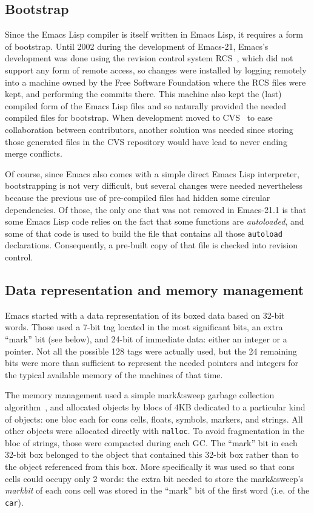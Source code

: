 \documentclass[format=acmsmall, review]{acmart}
\newcommand \Elisp {Emacs Lisp}
\begin{document}
\subsection{Bootstrap}
\label{sec:bootstrap}

Since the \Elisp{} compiler is itself written in \Elisp{}, it requires
a form of bootstrap.  Until 2002 during the development of Emacs-21, Emacs's
development was done using the revision control system RCS~\cite{Tichy85},
which did not support any form of remote access, so
changes were installed by logging remotely into a machine owned by the
Free Software Foundation where the RCS files were kept, and
performing the commits there.  This machine also kept the (last) compiled
form of the \Elisp{} files and so naturally provided the needed compiled
files for bootstrap.  When development moved to CVS~\cite{Berliner90} to ease
collaboration between contributors, another solution was needed since
storing those generated files in the CVS repository
would have lead to never ending merge conflicts.

Of course, since Emacs also comes with a simple direct \Elisp{} interpreter,
bootstrapping is not very difficult, but several changes were needed
nevertheless because the previous use of pre-compiled files had hidden some
circular dependencies.  Of those, the only one that was not removed in
Emacs-21.1 is that some \Elisp{} code relies on the fact that some
functions are \emph{autoloaded}, and some of that code is used to build the
file that contains all those \texttt{autoload} declarations.  Consequently,
a pre-built copy of that file is checked into revision control.

\subsection{Data representation and memory management}
\label{sec:data-representation}

Emacs started with a data representation of its boxed data based on 32-bit
words.  Those used a 7-bit tag located in the most significant bits, an extra
``mark'' bit (see below), and 24-bit of immediate data: either an integer or
a pointer.  Not all the possible 128 tags were actually used, but the 24
remaining bits were more than sufficient to represent the needed pointers and
integers for the typical available memory of the machines of that time.

The memory management used a simple mark\&sweep garbage collection
algorithm~\cite{McCarthy1960}, and allocated objects by blocs of 4KB dedicated to a particular
kind of objects: one bloc each for cons cells, floats, symbols, markers, and
strings. All other objects were allocated directly with \texttt{malloc}.
To avoid fragmentation in the bloc of strings, those were compacted during
each GC.  The ``mark'' bit in each 32-bit box belonged to the object
that contained this 32-bit box rather than to the object referenced from
this box.  More specifically it was used so that cons cells could
occupy only 2 words: the extra bit needed to store the mark\&sweep's
\emph{markbit} of each cons cell was stored in the ``mark'' bit of the first
word (i.e. of the \texttt{car}).
\end{document}
